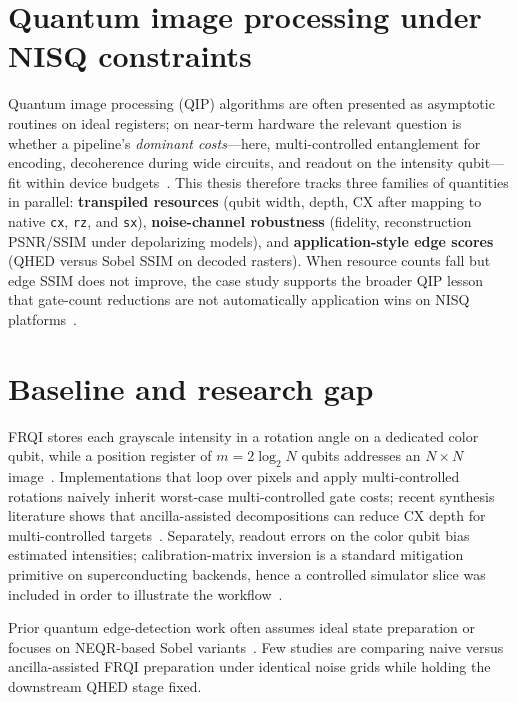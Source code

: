 \section{Quantum image processing under NISQ constraints}
Quantum image processing (QIP) algorithms are often presented as asymptotic routines on ideal registers; on near-term hardware the relevant question is whether a pipeline's \emph{dominant costs}---here, multi-controlled entanglement for encoding, decoherence during wide circuits, and readout on the intensity qubit---fit within device budgets~\cite{Preskill2018NISQ,Geng2022HybridNISQEdge}. This thesis therefore tracks three families of quantities in parallel: \textbf{transpiled resources} (qubit width, depth, CX after mapping to native \texttt{cx}, \texttt{rz}, and \texttt{sx}), \textbf{noise-channel robustness} (fidelity, reconstruction PSNR/SSIM under depolarizing models), and \textbf{application-style edge scores} (QHED versus Sobel SSIM on decoded rasters). When resource counts fall but edge SSIM does not improve, the case study supports the broader QIP lesson that gate-count reductions are not automatically application wins on NISQ platforms~\cite{Ruan2021OpportunitiesChallenges,Wang2022ReviewQIP}.

\section{Baseline and research gap}
FRQI stores each grayscale intensity in a rotation angle on a dedicated color qubit, while a position register of $m = 2\log_2 N$ qubits addresses an $N\times N$ image~\cite{Le2011FRQI,Iliyasu2013FRQIroadmap}. Implementations that loop over pixels and apply multi-controlled rotations naively inherit worst-case multi-controlled gate costs; recent synthesis literature shows that ancilla-assisted decompositions can reduce CX depth for multi-controlled targets~\cite{Vale2023MCSU2,Azevedo2024LowDepthMCG,Arsoski2024MCXQFT,Zindorf2024EfficientMCG}. Separately, readout errors on the color qubit bias estimated intensities; calibration-matrix inversion is a standard mitigation primitive on superconducting backends, hence a controlled simulator slice was included in order to illustrate the workflow~\cite{Mu2025GuidedImageFiltering}.

Prior quantum edge-detection work often assumes ideal state preparation or focuses on NEQR-based Sobel variants~\cite{Zhang2013NEQR,Zhang2015QSobel,Fan2019SobelNEQR,Chetia2021ImprovedSobelNEQR}. Few studies are comparing naive versus ancilla-assisted FRQI preparation under identical noise grids while holding the downstream QHED stage fixed.

